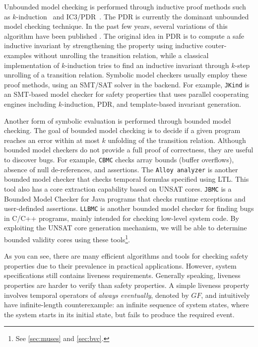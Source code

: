 Unbounded model checking is performed through inductive proof methods such as $k$-induction~\cite{SheeranSS00} and IC3/PDR~\cite{Een2011:PDR}.
The PDR is currently the dominant unbounded model checking technique. In the past few years, several variations of this algorithm have been published \cite{hoder2012generalized, vizel2014interpolating, jovanovic2016property, gurfinkelk}.
The original idea in PDR is to compute  a
safe  inductive  invariant by strengthening the property using inductive couter-examples without unrolling the transition relation, while a classical implementation of
$k$-induction tries to find an inductive invariant through
$k$-step unrolling of a transition relation. Symbolic model checkers usually employ these proof methods, using an SMT/SAT solver in the backend. For example, \texttt{JKind} \cite{jkind} is an SMT-based model checker for safety properties that uses parallel cooperating engines including $k$-induction, PDR, and template-based invariant generation.

Another form of symbolic evaluation is performed through bounded model checking.
The goal of bounded model checking is to decide if a given program reaches an error within at
most $k$ unfolding of the transition relation. Although bounded model checkers do not provide a full proof of correctness, they are useful to discover bugs. For example, \texttt{CBMC} \cite{cbmc} checks array bounds (buffer overflows), absence of
null de-references, and assertions. The \texttt{Alloy analyzer} \cite{alloy} is another bounded model checker that checks temporal formulas specified using LTL. This tool also has a core extraction capability based on UNSAT cores. \texttt{JBMC} \cite{jbmc} is a Bounded Model Checker for Java programs that checks runtime exceptions and user-definded assertions. \texttt{LLBMC} is another bounded model checker for finding bugs in C/C++ programs, mainly intended for checking low-level system code. By exploiting the UNSAT core generation mechanism, we will be able to determine bounded validity cores using these tools\footnote{See \ref{sec:muses} and \ref{sec:bvc}.}.

As you can see, there are many efficient
algorithms and tools for checking safety properties due to their prevalence in
practical applications. However, system specifications still contains liveness requirements.
Generally speaking, liveness properties are harder to verify than safety
properties.
A simple liveness property involves temporal operators of \emph{always eventually}, denoted by $GF$, and intuitively have infinite-length counterexample: an infinite sequence of system states,
where the system starts in its initial state, but fails to produce the required
event.

